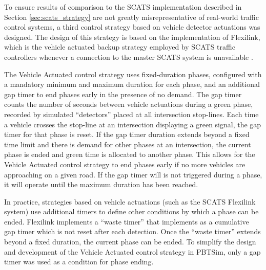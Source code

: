 To ensure results of comparison to the SCATS implementation described in Section \ref{sec:scats_strategy} are not greatly misrepresentative of real-world traffic control systems, a third control strategy based on vehicle detector actuations was designed. The design of this strategy is based on the implementation of Flexilink, which is the vehicle actuated backup strategy employed by SCATS traffic controllers whenever a connection to the master SCATS system is unavailable \cite{scatstraining}.

The Vehicle Actuated control strategy uses fixed-duration phases, configured with a mandatory minimum and maximum duration for each phase, and an additional gap timer to end phases early in the presence of no demand. The gap timer counts the number of seconds between vehicle actuations during a green phase, recorded by simulated ``detectors'' placed at all intersection stop-lines. Each time a vehicle crosses the stop-line at an intersection displaying a green signal, the gap timer for that phase is reset. If the gap timer duration extends beyond a fixed time limit and there is demand for other phases at an intersection, the current phase is ended and green time is allocated to another phase. This allows for the Vehicle Actuated control strategy to end phases early if no more vehicles are approaching on a given road. If the gap timer will is not triggered during a phase, it will operate until the maximum duration has been reached.

In practice, strategies based on vehicle actuations (such as the SCATS Flexilink system) use additional timers to define other conditions by which a phase can be ended. Flexilink implements a ``waste timer'' that implements as a cumulative gap timer which is not reset after each detection. Once the ``waste timer'' extends beyond a fixed duration, the current phase can be ended. To simplify the design and development of the Vehicle Actuated control strategy in PBTSim, only a gap timer was used as a condition for phase ending.  


